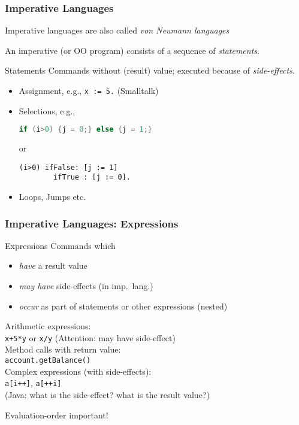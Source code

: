 \documentclass{beamer}
\begin{document}
\begin{frame}[fragile]
\frametitle{Imperative Languages}

Imperative languages are also called \textit{von Neumann languages}

\bigskip

An imperative (or OO program) consists of a sequence of \emph{statements}. 

\onslide<+->\medskip

\begin{block}{Statements}
  Commands without (result) value; executed because of \emph{side-effects}.
\begin{itemize}
  \item<2-> Assignment, e.g., \texttt{x := 5.} (Smalltalk) 
  \item<3-> Selections, e.g.,
\begin{lstlisting}[language=Java]
  if (i>0) {j = 0;} else {j = 1;}
\end{lstlisting}
or
\begin{lstlisting}[language=Smalltalk]
  (i>0) ifFalse: [j := 1] 
        ifTrue : [j := 0].
\end{lstlisting}
\item<4-> Loops, Jumps etc.
  \end{itemize}
\end{block}
\end{frame}

\begin{frame}[fragile]
\frametitle{Imperative Languages: Expressions}
\begin{block}{Expressions}
 Commands which
 \begin{itemize}
  \item \emph{have} a result value
  \item \emph{may have} side-effects (in imp.\ lang.)
  \item \emph{occur} as part of statements or other expressions
    (nested)
 \end{itemize}
  \begin{example}
    Arithmetic expressions:\\
    \quad \texttt{x+5*y} or \texttt{x/y} (Attention: may have  side-effect)\\
    Method calls with return value:\\
    \quad \texttt{account.getBalance()}\\
    Complex expressions (with side-effects):\\
    \quad \texttt{a[i++]}, \texttt{a[++i]}\\
    (Java: what is the side-effect? what is the result value?)\\
   \begin{center}\alert{Evaluation-order important!}\end{center}
  \end{example}
\end{block}
\end{frame}
\end{document}

